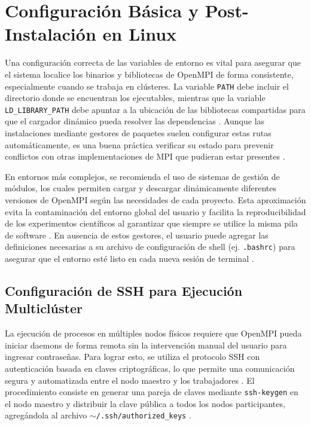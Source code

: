 \section{Configuración Básica y Post-Instalación en Linux}

Una configuración correcta de las variables de entorno es vital para asegurar que el sistema localice los binarios y bibliotecas de OpenMPI de forma consistente, especialmente cuando se trabaja en clústeres. La variable \texttt{PATH} debe incluir el directorio donde se encuentran los ejecutables, mientras que la variable \texttt{LD\_LIBRARY\_PATH} debe apuntar a la ubicación de las bibliotecas compartidas para que el cargador dinámico pueda resolver las dependencias \cite{ref11_cristian_OpenMPI_FAQ, ref13_cristian_Hokiegeek2024}. Aunque las instalaciones mediante gestores de paquetes suelen configurar estas rutas automáticamente, es una buena práctica verificar su estado para prevenir conflictos con otras implementaciones de MPI que pudieran estar presentes \cite{ref13_cristian_Hokiegeek2024}.

En entornos más complejos, se recomienda el uso de sistemas de gestión de módulos, los cuales permiten cargar y descargar dinámicamente diferentes versiones de OpenMPI según las necesidades de cada proyecto. Esta aproximación evita la contaminación del entorno global del usuario y facilita la reproducibilidad de los experimentos científicos al garantizar que siempre se utilice la misma pila de software \cite{ref11_cristian_OpenMPI_FAQ, ref12_cristian_Ubuntu_Packages}. En ausencia de estos gestores, el usuario puede agregar las definiciones necesarias a su archivo de configuración de shell (ej. \texttt{.bashrc}) para asegurar que el entorno esté listo en cada nueva sesión de terminal \cite{ref11_cristian_OpenMPI_FAQ}.

\subsection{Configuración de SSH para Ejecución Multiclúster}

La ejecución de procesos en múltiples nodos físicos requiere que OpenMPI pueda iniciar daemons de forma remota sin la intervención manual del usuario para ingresar contraseñas. Para lograr esto, se utiliza el protocolo SSH con autenticación basada en claves criptográficas, lo que permite una comunicación segura y automatizada entre el nodo maestro y los trabajadores \cite{ref11_cristian_OpenMPI_FAQ}. El procedimiento consiste en generar una pareja de claves mediante \texttt{ssh-keygen} en el nodo maestro y distribuir la clave pública a todos los nodos participantes, agregándola al archivo \texttt{$\sim$/.ssh/authorized\_keys} \cite{ref11_cristian_OpenMPI_FAQ}.

